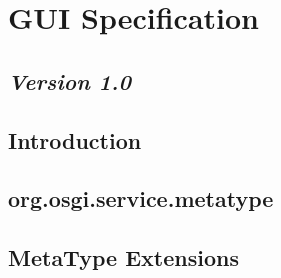 \section{GUI Specification}
\subsection*{\textit{Version 1.0}}
\subsection{Introduction}
\subsection{org.osgi.service.metatype}
\subsection{MetaType Extensions}
